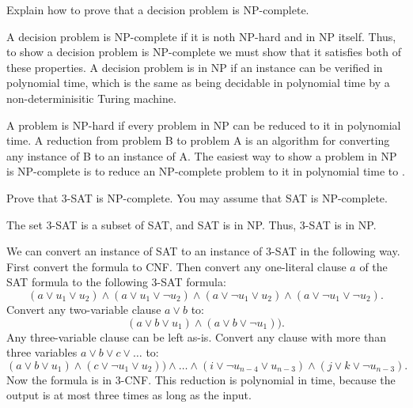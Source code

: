 \documentclass[addpoints,12pt]{exam}
\begin{document}
\begin{questions}
\begin{solution}
  \end{solution}


\question
  Explain how to prove that a decision problem is NP-complete.
  \begin{solution}
    A decision problem is NP-complete if it is noth NP-hard and in NP itself.
    Thus, to show a decision problem is NP-complete we must show that it satisfies both of these properties.
    A decision problem is in NP if an instance can be verified in polynomial time, which is the same as being decidable in polynomial time by a non-determinisitic Turing machine.

    A problem is NP-hard if every problem in NP can be reduced to it in polynomial time.
    A reduction from problem B to problem A is an algorithm for converting any instance of B to an instance of A.
    The easiest way to show a problem in NP is NP-complete is to reduce an NP-complete problem to it in polynomial time to .
  \end{solution}


\question
  Prove that 3-SAT is NP-complete. You may assume that SAT is NP-complete.
  \begin{solution}
    The set 3-SAT is a subset of SAT, and SAT is in NP.
    Thus, 3-SAT is in NP.

    We can convert an instance of SAT to an instance of 3-SAT in the following way.
    First convert the formula to CNF.
    Then convert any one-literal clause $a$ of the SAT formula to the following 3-SAT formula:
      $$(a \lor u_1 \lor u_2) \land (a \lor u_1 \lor \neg u_2) \land (a \lor \neg u_1 \lor u_2) \land (a \lor \neg u_1 \lor \neg u_2).$$
    Convert any two-variable clause $a \lor b$ to:
      $$(a \lor b \lor u_1) \land (a \lor b \lor \neg u_1)).$$
    Any three-variable clause can be left as-is.
    Convert any clause with more than three variables $a \lor b \lor c \lor \ldots$ to:
      $$(a \lor b \lor u_1) \land (c \lor \neg u_1 \lor u_2)) \land \ldots \land (i \lor \neg u_{n-4} \lor u_{n-3}) \land (j \lor k \lor \neg u_{n-3}).$$
    Now the formula is in 3-CNF.
    This reduction is polynomial in time, because the output is at most three times as long as the input.
  \end{solution}



\end{questions}


\end{document}
